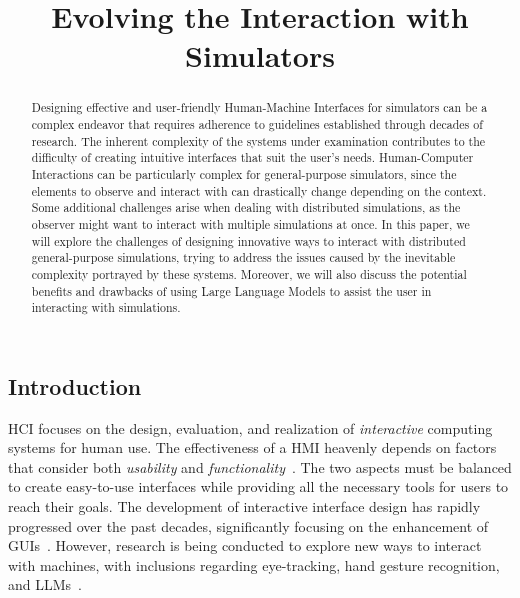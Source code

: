 \documentclass[conference]{IEEEtran}
\begin{document}
\title{Evolving the Interaction with Simulators\\
}

\author{
}

\maketitle

\begin{abstract}
    Designing effective and user-friendly Human-Machine Interfaces for simulators can be a complex endeavor that requires adherence to guidelines
    established through decades of research.
    The inherent complexity of the systems under examination contributes to the difficulty of creating intuitive interfaces that suit the user's needs.
    Human-Computer Interactions can be particularly complex for general-purpose simulators,
    since the elements to observe and interact with can drastically change depending on the context.
    Some additional challenges arise when dealing with distributed simulations,
    as the observer might want to interact with multiple simulations at once.
    In this paper,
    we will explore the challenges of designing innovative ways to interact with distributed general-purpose simulations,
    trying to address the issues caused by the inevitable complexity portrayed by these systems.
    Moreover,
    we will also discuss the potential benefits and drawbacks of using Large Language Models to assist the user in interacting with simulations.
\end{abstract}


\subsection{Introduction}
\ac{HCI} focuses on the design,
evaluation,
and realization of \emph{interactive} computing systems for human use.
The effectiveness of a \ac{HMI} heavenly depends on factors that consider both \emph{usability} and \emph{functionality}~\cite{Sinha2010}.
%
The two aspects must be balanced to create easy-to-use interfaces
while providing all the necessary tools for users to reach their goals.
%
The development of interactive interface design has rapidly progressed over the past decades,
significantly focusing on the enhancement of \acp{GUI}~\cite{Murad2019}.
%
However,
research is being conducted to explore new ways to interact with machines,
with inclusions regarding eye-tracking,
hand gesture recognition,
and \acp{LLM}~\cite{Poole2006, Sarma2021, kapania2024imcategorizingllmproductivity}.
\end{document}
